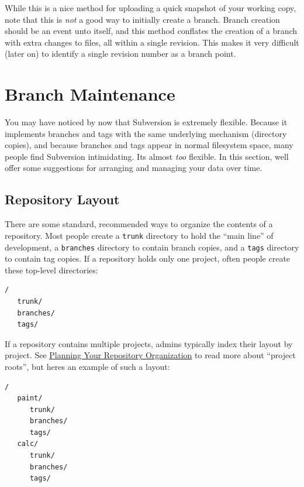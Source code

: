 While this is a nice method for uploading a quick snapshot of your
working copy, note that this is \emph{not} a good way to initially
create a branch. Branch creation should be an event unto itself, and
this method conflates the creation of a branch with extra changes to
files, all within a single revision. This makes it very difficult (later
on) to identify a single revision number as a branch point.

\section{Branch Maintenance}\label{svn.branchmerge.maint}

You may have noticed by now that Subversion is extremely flexible.
Because it implements branches and tags with the same underlying
mechanism (directory copies), and because branches and tags appear in
normal filesystem space, many people find Subversion intimidating.
It\textquotesingle s almost \emph{too} flexible. In this section,
we\textquotesingle ll offer some suggestions for arranging and managing
your data over time.

\subsection{Repository Layout}\label{svn.branchmerge.maint.layout}

There are some standard, recommended ways to organize the contents of a
repository. Most people create a \texttt{trunk} directory to hold the
``main line'' of development, a \texttt{branches} directory to contain
branch copies, and a \texttt{tags} directory to contain tag copies. If a
repository holds only one project, often people create these top-level
directories:

\begin{verbatim}
/
   trunk/
   branches/
   tags/
\end{verbatim}

If a repository contains multiple projects, admins typically index their
layout by project. See
\hyperref[svn.reposadmin.projects.chooselayout]{Planning Your Repository
Organization} to read more about ``project roots'', but
here\textquotesingle s an example of such a layout:

\begin{verbatim}
/
   paint/
      trunk/
      branches/
      tags/
   calc/
      trunk/
      branches/
      tags/
\end{verbatim}

